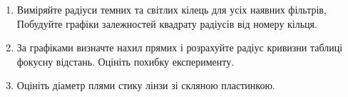 \begin{enumerate}
    \item Виміряйте радіуси темних та світлих кілець для усіх наявних фільтрів,
    Побудуйте графіки залежностей квадрату радіусів від номеру кільця.
    
    \item За графіками визначте нахил прямих і розрахуйте радіус кривизни таблиці
     фокусну відстань. Оцініть похибку експерименту.

    \item Оцініть діаметр плями стику лінзи зі скляною пластинкою.
\end{enumerate}